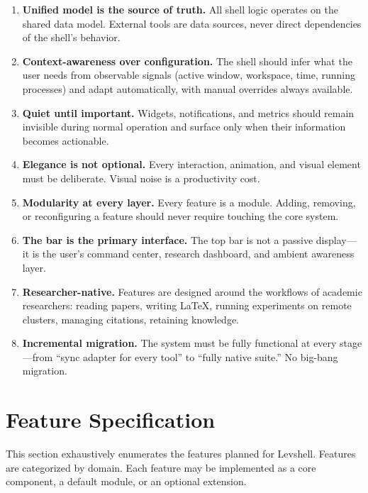 \documentclass[11pt,a4paper]{article}
\begin{document}
\begin{principlebox}
\begin{enumerate}[leftmargin=1.5em, itemsep=3pt]
  \item \textbf{Unified model is the source of truth.} All shell logic operates on the shared data model. External tools are data sources, never direct dependencies of the shell's behavior.
  \item \textbf{Context-awareness over configuration.} The shell should infer what the user needs from observable signals (active window, workspace, time, running processes) and adapt automatically, with manual overrides always available.
  \item \textbf{Quiet until important.} Widgets, notifications, and metrics should remain invisible during normal operation and surface only when their information becomes actionable.
  \item \textbf{Elegance is not optional.} Every interaction, animation, and visual element must be deliberate. Visual noise is a productivity cost.
  \item \textbf{Modularity at every layer.} Every feature is a module. Adding, removing, or reconfiguring a feature should never require touching the core system.
  \item \textbf{The bar is the primary interface.} The top bar is not a passive display---it is the user's command center, research dashboard, and ambient awareness layer.
  \item \textbf{Researcher-native.} Features are designed around the workflows of academic researchers: reading papers, writing \LaTeX{}, running experiments on remote clusters, managing citations, retaining knowledge.
  \item \textbf{Incremental migration.} The system must be fully functional at every stage---from ``sync adapter for every tool'' to ``fully native suite.'' No big-bang migration.
\end{enumerate}
\end{principlebox}


\section{Feature Specification}
\label{sec:features}

This section exhaustively enumerates the features planned for Levshell. Features are categorized by domain. Each feature may be implemented as a core component, a default module, or an optional extension.
\end{document}
